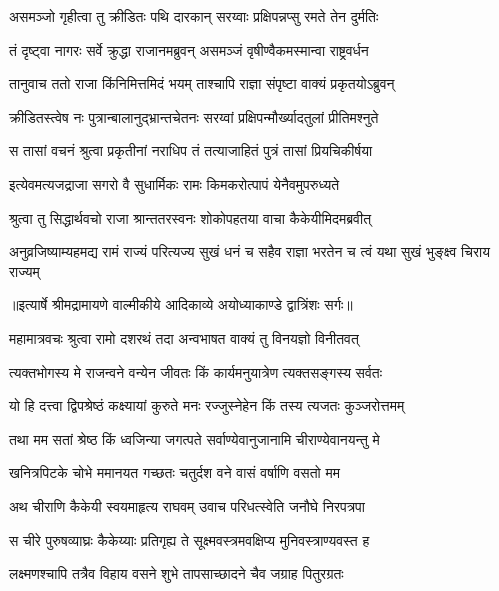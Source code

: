 \twolineshloka
{असमञ्जो गृहीत्वा तु क्रीडितः पथि दारकान्}
{सरय्वाः प्रक्षिपन्नप्सु रमते तेन दुर्मतिः} %

\twolineshloka
{तं दृष्ट्वा नागरः सर्वे क्रुद्धा राजानमब्रुवन्}
{असमञ्जं वृषीण्वैकमस्मान्वा राष्ट्रवर्धन} %

\twolineshloka
{तानुवाच ततो राजा किंनिमित्तमिदं भयम्}
{ताश्चापि राज्ञा संपृष्टा वाक्यं प्रकृतयोऽब्रुवन्} %

\twolineshloka
{क्रीडितस्त्वेष नः पुत्रान्बालानुद्भ्रान्तचेतनः}
{सरय्वां प्रक्षिपन्मौर्ख्यादतुलां प्रीतिमश्नुते} %

\twolineshloka
{स तासां वचनं श्रुत्वा प्रकृतीनां नराधिप}
{तं तत्याजाहितं पुत्रं तासां प्रियचिकीर्षया} %

\twolineshloka
{इत्येवमत्यजद्राजा सगरो वै सुधार्मिकः}
{रामः किमकरोत्पापं येनैवमुपरुध्यते} %

\twolineshloka
{श्रुत्वा तु सिद्धार्थवचो राजा श्रान्ततरस्वनः}
{शोकोपहतया वाचा कैकेयीमिदमब्रवीत्} %

\fourlineindentedshloka
{अनुव्रजिष्याम्यहमद्य रामं}
{ राज्यं परित्यज्य सुखं धनं च}
{सहैव राज्ञा भरतेन च त्वं}
{ यथा सुखं भुङ्क्ष्व चिराय राज्यम्} %


{॥इत्यार्षे श्रीमद्रामायणे वाल्मीकीये आदिकाव्ये अयोध्याकाण्डे द्वात्रिंशः सर्गः॥}


\twolineshloka
{महामात्रवचः श्रुत्वा रामो दशरथं तदा}
{अन्वभाषत वाक्यं तु विनयज्ञो विनीतवत्} %

\twolineshloka
{त्यक्तभोगस्य मे राजन्वने वन्येन जीवतः}
{किं कार्यमनुयात्रेण त्यक्तसङ्गस्य सर्वतः} %

\twolineshloka
{यो हि दत्त्वा द्विपश्रेष्ठं कक्ष्यायां कुरुते मनः}
{रज्जुस्नेहेन किं तस्य त्यजतः कुञ्जरोत्तमम्} %

\twolineshloka
{तथा मम सतां श्रेष्ठ किं ध्वजिन्या जगत्पते}
{सर्वाण्येवानुजानामि चीराण्येवानयन्तु मे} %

\twolineshloka
{खनित्रपिटके चोभे ममानयत गच्छतः}
{चतुर्दश वने वासं वर्षाणि वसतो मम} %

\twolineshloka
{अथ चीराणि कैकेयी स्वयमाहृत्य राघवम्}
{उवाच परिधत्स्वेति जनौघे निरपत्रपा} %

\twolineshloka
{स चीरे पुरुषव्याघ्रः कैकेय्याः प्रतिगृह्य ते}
{सूक्ष्मवस्त्रमवक्षिप्य मुनिवस्त्राण्यवस्त ह} %

\twolineshloka
{लक्ष्मणश्चापि तत्रैव विहाय वसने शुभे}
{तापसाच्छादने चैव जग्राह पितुरग्रतः} %

